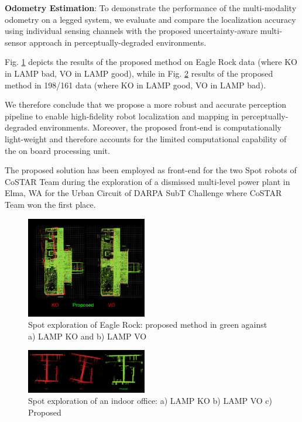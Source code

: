 \documentclass[a4paper, 10pt, conference]{ieeeconf}      %
\newcommand{\ph}[1]{{\textbf{#1}:}} %
\begin{document}
\ph{Odometry Estimation}
To demonstrate the performance of the multi-modality odometry on a legged system, we evaluate and compare the localization accuracy using individual sensing channels with the proposed uncertainty-aware multi-sensor approach in perceptually-degraded environments. 

Fig. \ref{spot_eagle_rock} depicts the results of the proposed method on Eagle Rock data (where KO in LAMP bad, VO in LAMP good), while in Fig. \ref{spot_indoor_office} results of the proposed method in 198/161 data (where KO in LAMP good, VO in LAMP bad). 


We therefore conclude that we propose a more robust and accurate perception pipeline to enable high-fidelity robot localization and mapping in perceptually-degraded environments. Moreover, the proposed front-end is computationally light-weight and therefore accounts for the limited computational capability of the on board processing unit.

The proposed solution has been employed as front-end for the two Spot robots of CoSTAR Team during the exploration of a dismissed multi-level power plant in Elma, WA for the Urban Circuit of DARPA SubT Challenge where CoSTAR Team won the first place.

\begin{figure}[thpb]
  \centering
  \includegraphics[width=0.47\textwidth]{spot_iros/graphics/spot_eagle_rock.PNG}
  \caption{Spot exploration of Eagle Rock: proposed method in green against a) LAMP KO and b) LAMP VO}
  \label{spot_eagle_rock}
\end{figure}

\begin{figure}[thpb]
  \centering
  \includegraphics[width=0.47\textwidth]{spot_iros/graphics/spot_198_office.PNG}
  \caption{Spot exploration of an indoor office: a) LAMP KO b) LAMP VO c) Proposed}
  \label{spot_indoor_office}
\end{figure}
\end{document}
